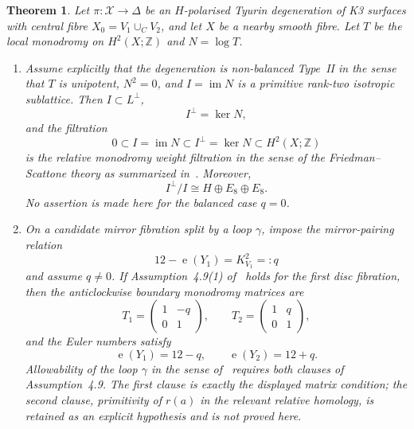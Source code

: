 \documentclass[12pt]{article}
\theoremstyle{plain}
\newtheorem{theorem}{Theorem}[section]
\theoremstyle{definition}
\DeclareMathOperator{\im}{im}
\DeclareMathOperator{\eul}{e}
\newcommand{\bZ}{\mathbb{Z}}
\newcommand{\cX}{\mathcal{X}}
\begin{document}
\begin{theorem}\label{thm:typeII}
Let $\pi\colon \cX\to \Delta$ be an $H$-polarised Tyurin degeneration of K3 surfaces with central fibre $X_0=V_1\cup_C V_2$, and let $X$ be a nearby smooth fibre.  Let $T$ be the local monodromy on $H^2(X;\bZ)$ and $N=\log T$.

\begin{enumerate}
\item Assume explicitly that the degeneration is non-balanced Type~II in the sense that $T$ is unipotent, $N^2=0$, and $I=\im N$ is a primitive rank-two isotropic sublattice.  Then $I\subset L^\perp$,
\[
I^\perp = \ker N,
\]
and the filtration
\[
0\subset I=\im N\subset I^\perp=\ker N\subset H^2(X;\bZ)
\]
is the relative monodromy weight filtration in the sense of the Friedman--Scattone theory as summarized in~\cite[\S3.1]{GT24}.  Moreover,
\[
I^\perp/I\cong H\oplus E_8\oplus E_8.
\]
No assertion is made here for the balanced case $q=0$.

\item On a candidate mirror fibration split by a loop $\gamma$, impose the mirror-pairing relation
\[
12-\eul(Y_1)=K_{V_1}^2=:q
\]
and assume $q\neq 0$.  If Assumption~4.9(1) of~\cite{GT24} holds for the first disc fibration, then the anticlockwise boundary monodromy matrices are
\[
T_1=
\begin{pmatrix}
1 & -q\\
0 & 1
\end{pmatrix},
\qquad
T_2=
\begin{pmatrix}
1 & q\\
0 & 1
\end{pmatrix},
\]
and the Euler numbers satisfy
\[
\eul(Y_1)=12-q,
\qquad
\eul(Y_2)=12+q.
\]
Allowability of the loop $\gamma$ in the sense of~\cite[Definition~4.11]{GT24} requires both clauses of Assumption~4.9.  The first clause is exactly the displayed matrix condition; the second clause, primitivity of $r(a)$ in the relevant relative homology, is retained as an explicit hypothesis and is not proved here.
\end{enumerate}
\end{theorem}
\end{document}
